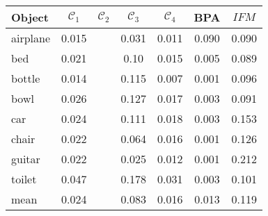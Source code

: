 \begin{center}
     \label{tab:distance7500} 
    \begin{tabular}{| l  | c | c | c | c | c | c |}
        \hline
        Object& $\mathcal{C}_1$ & $\mathcal{C}_2$ & $\mathcal{C}_3$ &$\mathcal{C}_4$ & BPA & $IFM$  \\ \hline
        airplane&0.015&&0.031&0.011&0.090&0.090\\\hline
        bed&0.021&&0.10&0.015&0.005&0.089\\\hline
        bottle&0.014&&0.115&0.007&0.001&0.096\\\hline
        bowl&0.026&&0.127&0.017&0.003&0.091\\\hline
        car&0.024&&0.111&0.018&0.003&0.153\\\hline
        chair&0.022&&0.064&0.016&0.001&0.126\\\hline
        guitar&0.022&&0.025&0.012&0.001&0.212\\\hline
        toilet&0.047&&0.178&0.031&0.003&0.101\\\hline\hline
        mean&0.024&&0.083&0.016&0.013&0.119\\\hline
    \end{tabular}
\end{center}

